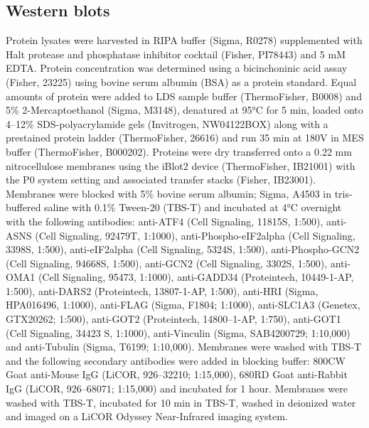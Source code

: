 \subsection{Western blots}
Protein lysates were harvested in RIPA buffer (Sigma, R0278) supplemented with Halt protease and phosphatase inhibitor cocktail (Fisher, PI78443) and 5 mM EDTA.
Protein concentration was determined using a bicinchoninic acid assay (Fisher, 23225) using bovine serum albumin (BSA) as a protein standard.
Equal amounts of protein were added to LDS sample buffer (ThermoFisher, B0008) and 5\% 2-Mercaptoethanol (Sigma, M3148), denatured at 95°C for 5 min, loaded onto 4–12\% SDS-polyacrylamide gels (Invitrogen, NW04122BOX) along with a prestained protein ladder (ThermoFisher, 26616) and run 35 min at 180V in MES buffer (ThermoFisher, B000202).
Proteins were dry transferred onto a 0.22 mm nitrocellulose membranes using the iBlot2 device (ThermoFisher, IB21001) with the P0 system setting and associated transfer stacks (Fisher, IB23001).
Membranes were blocked with 5\% bovine serum albumin; Sigma, A4503 in tris-buffered saline with 0.1\% Tween-20 (TBS-T) and incubated at 4°C overnight with the following antibodies:
anti-ATF4 (Cell Signaling, 11815S, 1:500),
anti-ASNS (Cell Signaling, 92479T, 1:1000),
anti-Phospho-eIF2alpha (Cell Signaling, 3398S, 1:500),
anti-eIF2alpha (Cell Signaling, 5324S, 1:500),
anti-Phospho-GCN2 (Cell Signaling, 94668S, 1:500),
anti-GCN2 (Cell Signaling, 3302S, 1:500),
anti-OMA1 (Cell Signaling, 95473, 1:1000),
anti-GADD34 (Proteintech, 10449-1-AP, 1:500),
anti-DARS2 (Proteintech, 13807-1-AP, 1:500),
anti-HRI (Sigma, HPA016496, 1:1000),
anti-FLAG (Sigma, F1804; 1:1000),
anti-SLC1A3 (Genetex, GTX20262; 1:500),
anti-GOT2 (Proteintech, 14800–1-AP, 1:750),
anti-GOT1 (Cell Signaling, 34423 S, 1:1000),
anti-Vinculin (Sigma, SAB4200729; 1:10,000) and anti-Tubulin (Sigma, T6199; 1:10,000).
Membranes were washed with TBS-T and the following secondary antibodies were added in blocking buffer: 800CW Goat anti-Mouse IgG (LiCOR, 926–32210; 1:15,000), 680RD Goat anti-Rabbit IgG (LiCOR, 926–68071; 1:15,000) and incubated for 1 hour.
Membranes were washed with TBS-T, incubated for 10 min in TBS-T, washed in deionized water and imaged on a LiCOR Odyssey Near-Infrared imaging system.


